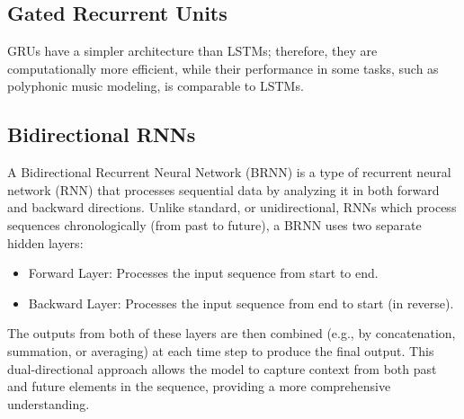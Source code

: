 \subsection{Gated Recurrent Units}
GRUs have a simpler architecture than LSTMs; therefore, they are computationally more efficient, while their performance in some tasks, such as polyphonic music modeling, is comparable to LSTMs.

\subsection{Bidirectional RNNs}
A Bidirectional Recurrent Neural Network (BRNN) is a type of recurrent neural network (RNN) that processes sequential data by analyzing it in both forward and backward directions. Unlike standard, or unidirectional, RNNs which process sequences chronologically (from past to future), a BRNN uses two separate hidden layers:

\begin{itemize}
    \item Forward Layer: Processes the input sequence from start to end.
    \item Backward Layer: Processes the input sequence from end to start (in reverse).
\end{itemize}

The outputs from both of these layers are then combined (e.g., by concatenation, summation, or averaging) at each time step to produce the final output. This dual-directional approach allows the model to capture context from both past and future elements in the sequence, providing a more comprehensive understanding.

